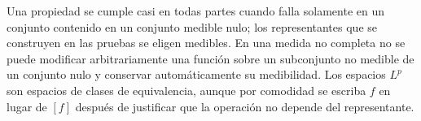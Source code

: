 Una propiedad se cumple casi en todas partes cuando falla solamente en un conjunto contenido en un conjunto medible nulo; los representantes que se construyen en las pruebas se eligen medibles. En una medida no completa no se puede modificar arbitrariamente una función sobre un subconjunto no medible de un conjunto nulo y conservar automáticamente su medibilidad. Los espacios $L^p$ son espacios de clases de equivalencia, aunque por comodidad se escriba $f$ en lugar de $[f]$ después de justificar que la operación no depende del representante.
